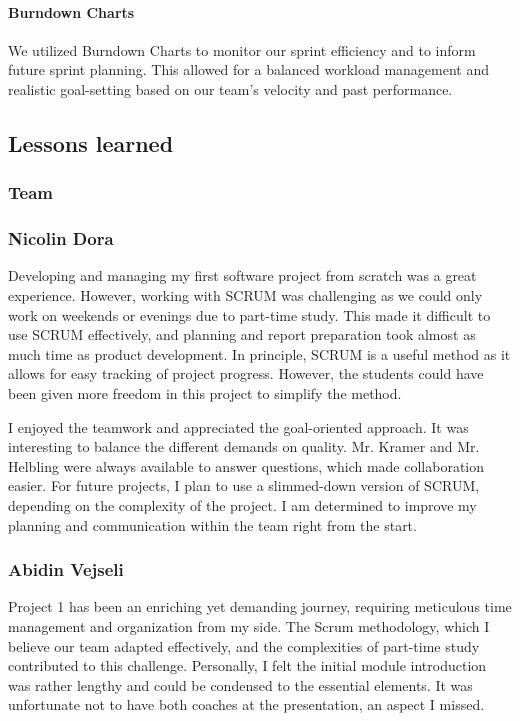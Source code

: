 \paragraph{Burndown Charts}
We utilized Burndown Charts to monitor our sprint efficiency and to inform future sprint planning.
This allowed for a balanced workload management and realistic goal-setting based on our team's velocity and past performance.


\subsection{Lessons learned}

\subsubsection{Team}

\subsubsection{Nicolin Dora}
Developing and managing my first software project from scratch was a great experience.
However, working with SCRUM was challenging as we could only work on weekends or evenings due to part-time study.
This made it difficult to use SCRUM effectively, and planning and report preparation took almost as much time as product development.
In principle, SCRUM is a useful method as it allows for easy tracking of project progress.
However, the students could have been given more freedom in this project to simplify the method.

I enjoyed the teamwork and appreciated the goal-oriented approach.
It was interesting to balance the different demands on quality.
Mr. Kramer and Mr. Helbling were always available to answer questions, which made collaboration easier.
For future projects, I plan to use a slimmed-down version of SCRUM, depending on the complexity of the project.
I am determined to improve my planning and communication within the team right from the start.

\subsubsection{Abidin Vejseli}
Project 1 has been an enriching yet demanding journey, requiring meticulous time management and organization from my side.
The Scrum methodology, which I believe our team adapted effectively, and the complexities of part-time study contributed to this challenge.
Personally, I felt the initial module introduction was rather lengthy and could be condensed to the essential elements.
It was unfortunate not to have both coaches at the presentation, an aspect I missed.

